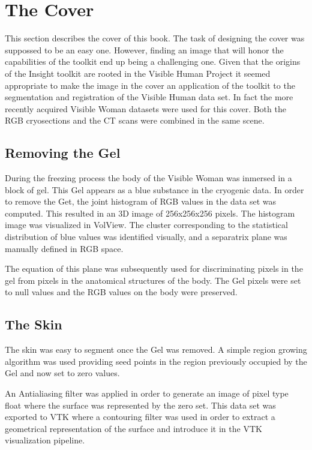 \chapter*{The Cover}

This section describes the cover of this book. The task of designing the cover
was suppossed to be an easy one. However, finding an image that will honor the
capabilities of the toolkit end up being a challenging one. Given that the
origins of the Insight toolkit are rooted in the Visible Human Project it
seemed appropriate to make the image in the cover an application of the toolkit
to the segmentation and registration of the Visible Human data set. In fact the
more recently acquired Visible Woman datasets were used for this cover.  Both
the RGB cryosections and the CT scans were combined in the same scene.

\section*{Removing the Gel}

During the freezing process the body of the Visible Woman was inmersed in a
block of gel. This Gel appears as a blue substance in the cryogenic data.  In
order to remove the Get, the joint histogram of RGB values in the data set was
computed. This resulted in an 3D image of 256x256x256 pixels. The histogram
image was visualized in VolView. The cluster corresponding to the statistical
distribution of blue values was identified visually, and a separatrix plane was
manually defined in RGB space.

The equation of this plane was subsequently used for discriminating pixels in
the gel from pixels in the anatomical structures of the body. The Gel pixels
were set to null values and the RGB values on the body were preserved.

\section*{The Skin}

The skin was easy to segment once the Gel was removed. A simple region growing
algorithm was used providing seed points in the region previously occupied by
the Gel and now set to zero values. 

An Antialiasing filter was applied in order to generate an image of pixel type
float where the surface was represented by the zero set. This data set was
exported to VTK where a contouring filter was used in order to extract a
geometrical representation of the surface and introduce it in the VTK
visualization pipeline.


